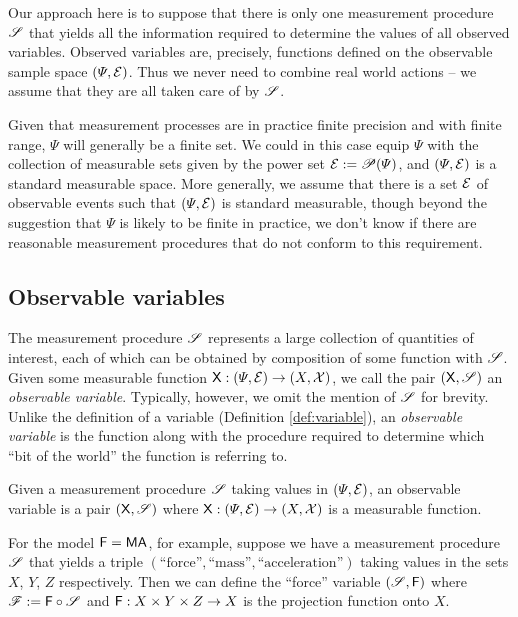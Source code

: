 Our approach here is to suppose that there is only one measurement procedure $\mathscr{S}$ that yields all the information required to determine the values of all observed variables. Observed variables are, precisely, functions defined on the observable sample space $(\Psi,\mathcal{E})$. Thus we never need to combine real world actions -- we assume that they are all taken care of by $\mathscr{S}$.

Given that measurement processes are in practice finite precision and with finite range, $\Psi$ will generally be a finite set. We could in this case equip $\Psi$ with the collection of measurable sets given by the power set $\mathcal{E}:=\mathscr{P}(\Psi)$, and $(\Psi,\mathcal{E})$ is a standard measurable space. More generally, we assume that there is a set $\mathcal{E}$ of observable events such that $(\Psi,\mathcal{E})$ is standard measurable, though beyond the suggestion that $\Psi$ is likely to be finite in practice, we don't know if there are reasonable measurement procedures that do not conform to this requirement.

\subsection{Observable variables}

The measurement procedure $\mathscr{S}$ represents a large collection of quantities of interest, each of which can be obtained by composition of some function with $\mathscr{S}$. Given some measurable function $\mathsf{X}:(\Psi,\mathcal{E})\to(X,\mathcal{X})$, we call the pair $(\mathsf{X},\mathscr{S})$ an \emph{observable variable}. Typically, however, we omit the mention of $\mathscr{S}$ for brevity. Unlike the definition of a variable (Definition \ref{def:variable}), an \emph{observable variable} is the function along with the procedure required to determine which ``bit of the world'' the function is referring to.

\begin{definition}
Given a measurement procedure $\mathscr{S}$ taking values in $(\Psi,\mathcal{E})$, an observable variable is a pair $(\mathsf{X},\mathscr{S})$ where $\mathsf{X}:(\Psi,\mathcal{E})\to (X,\mathcal{X})$ is a measurable function.
\end{definition}

For the model $\mathsf{F}=\mathsf{MA}$, for example, suppose we have a measurement procedure $\mathscr{S}$ that yields a triple $(\text{``force''},\text{``mass''},\text{``acceleration''})$ taking values in the sets $X$, $Y$, $Z$ respectively. Then we can define the ``force'' variable $(\mathscr{S},\mathsf{F})$ where $\mathscr{F}:=\mathsf{F}\circ \mathscr{S}$ and $\mathsf{F}:X\times Y\times Z\to X$ is the projection function onto $X$.


